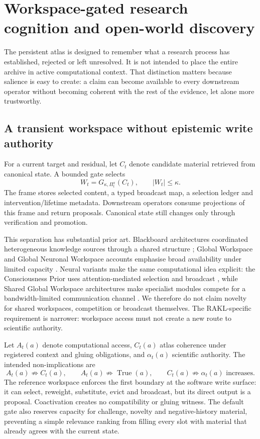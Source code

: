 \section{Workspace-gated research cognition and open-world discovery}

The persistent atlas is designed to remember what a research process has established, rejected or left unresolved. It is not intended to place the entire archive in active computational context. That distinction matters because salience is easy to create: a claim can become available to every downstream operator without becoming coherent with the rest of the evidence, let alone more trustworthy.

\subsection{A transient workspace without epistemic write authority}

For a current target and residual, let \(C_t\) denote candidate material retrieved from canonical state. A bounded gate selects
\[
W_t=G_{\kappa,\Pi_t^x}(C_t),\qquad |W_t|\leq\kappa .
\]
The frame stores selected content, a typed broadcast map, a selection ledger and intervention/lifetime metadata. Downstream operators consume projections of this frame and return proposals. Canonical state still changes only through verification and promotion.

This separation has substantial prior art. Blackboard architectures coordinated heterogeneous knowledge sources through a shared structure \cite{hayesroth1985,nii1986}; Global Workspace and Global Neuronal Workspace accounts emphasise broad availability under limited capacity \cite{dehaene2001,mashour2020}. Neural variants make the same computational idea explicit: the Consciousness Prior uses attention-mediated selection and broadcast \cite{bengio2017}, while Shared Global Workspace architectures make specialist modules compete for a bandwidth-limited communication channel \cite{goyal2021}. We therefore do not claim novelty for shared workspaces, competition or broadcast themselves. The RAKL-specific requirement is narrower: workspace access must not create a new route to scientific authority.

Let \(A_t(a)\) denote computational access, \(C_t(a)\) atlas coherence under registered context and gluing obligations, and \(\alpha_t(a)\) scientific authority. The intended non-implications are
\[
A_t(a)\not\Rightarrow C_t(a),\qquad
A_t(a)\not\Rightarrow \operatorname{True}(a),\qquad
C_t(a)\not\Rightarrow \alpha_t(a)\text{ increases}.
\]
The reference workspace enforces the first boundary at the software write surface: it can select, reweight, substitute, evict and broadcast, but its direct output is a proposal. Coactivation creates no compatibility or gluing witness. The default gate also reserves capacity for challenge, novelty and negative-history material, preventing a simple relevance ranking from filling every slot with material that already agrees with the current state.

